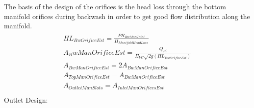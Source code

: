 \documentclass[letterpaper,10pt,english]{sphinxmanual}
\begin{document}
The basis of the design of the orifices is the head loss through the bottom manifold orifices during backwash in order to get good flow distribution along the manifold.
\begin{align}\label{equation:Filtration/Filtration_Derivations:Filtration/Filtration_Derivations:43}\!\begin{aligned}
HL_{BwOrificeEst} = \frac{PR_{BwManTotal}}{\Pi_{ManifoldHeadLoss}}\\
A_BwManOrificeEst = \frac{Q_{Fi}}{\Pi_{VC}\sqrt{2g(HL_{BwOrificeEst})}}\\
A_{BwManOrificeEst} = 2A_{BwManOrificeEst}\\
A_{TopManOrificeEst} = A_{BwManOrificeEst}\\
A_{OutletManSlots} = A_{InletManOrificesEst}\\
\end{aligned}\end{align}
Outlet Design:
\end{document}
